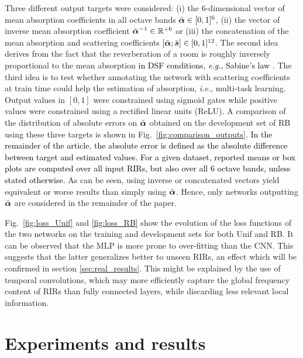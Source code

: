 \documentclass[reprint]{JASA}
\def\alphavect{\mbox{\boldmath $\alpha$}}
\begin{document}
Three different output targets were considered: (i) the 6-dimensional vector of mean absorption coefficients in all octave bands $\bar{\alphavect} \in [0, 1]^6$, (ii) the vector of inverse mean absorption coefficient $\bar{\alphavect}^{-1}\in\mathbb{R}^{+6}$ or (iii) the concatenation of the mean absorption and scattering coefficients $[\bar{\alphavect};\bar{\boldsymbol{s}}]\in[0, 1]^{12}$.  The second idea derives from the fact that the reverberation of a room is roughly inversely proportional to the mean absorption \textcolor{black}{in DSF conditions, \textit{e.g.}, Sabine's law} \cite{Kuttruff:09}. The third idea is to test whether annotating the network with scattering coefficients at train time could help the estimation of absorption, \textit{i.e.}, multi-task learning. Output values in $[0,1]$ were constrained using sigmoid gates while positive values were constrained using a rectified linear units (ReLU). A comparison of the distribution of absolute errors on $\bar{\alphavect}$ obtained on the development set of RB using these three targets is shown in Fig.~\ref{fig:comparison_outputs}. \textcolor{black}{In the remainder of the article, the absolute error is defined as the absolute difference between target and estimated values. For a given dataset, reported means or box plots are computed over all input RIRs, but also over all 6 octave bands, unless stated otherwise.} As can be seen, using inverse or concatenated vectors yield equivalent or worse results than simply using $\bar{\alphavect}$. Hence, only networks outputting $\bar{\alphavect}$ are considered in the remainder of the paper.

Fig.~\ref{fig:loss_Unif} and \ref{fig:loss_RB} show the evolution of the loss functions of the two networks on the training and development sets for both Unif and RB. It can be observed that the MLP is more prone to over-fitting than the CNN. This suggests that the latter generalizes better to unseen RIRs, an effect which will be confirmed in section \ref{sec:real_results}. This might be explained by the use of temporal convolutions, which may more efficiently capture the global frequency content of RIRs than fully connected layers, while discarding less relevant local information.

\section{\label{sec:results} Experiments and results}
\end{document}
